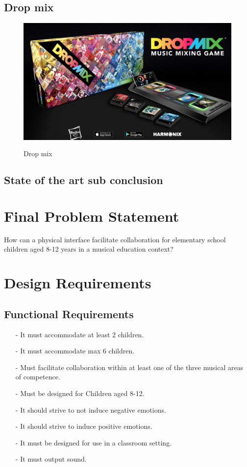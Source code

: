 \subsection{Drop mix} 

\begin{figure}[H]
	\centering
	\includegraphics[width=0.7\linewidth]{figure/Analysis/dropmix}
	\label{fig:dropmix}
	\caption{Drop mix}
\end{figure}


	 
	\subsection{State of the art sub conclusion}


\section{Final Problem Statement}
	How can a physical interface facilitate collaboration for elementary school children aged 8-12 years in a musical education context?
	
\section{Design Requirements}
	\subsection*{Functional Requirements}
		\begin{itemize}
			\item[-] It must accommodate at least 2 children.\\
			\item[-] It must accommodate max 6 children.\\
			\item[-] Must facilitate collaboration within at least one of the three musical areas of competence.\\
			\item[-] Must be designed for Children aged 8-12.\\
			\item[-] It should strive to not induce  negative emotions.\\
			\item[-] It should strive to induce positive emotions.\\
			\item[-] It must be designed for use in a classroom setting.\\
			\item[-] It must output sound.
		\end{itemize}
